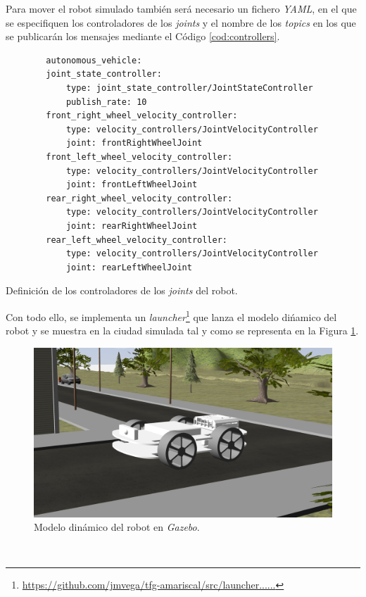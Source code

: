 Para mover el robot simulado también será necesario un fichero \textit{YAML}, en el que se especifiquen los controladores de los \textit{joints} y el nombre de los \textit{topics} en los que se publicarán los mensajes mediante el Código \ref{cod:controllers}.\\

\begin{code}[h]
	\begin{lstlisting}
		autonomous_vehicle:
		joint_state_controller:
			type: joint_state_controller/JointStateController
			publish_rate: 10
		front_right_wheel_velocity_controller:
			type: velocity_controllers/JointVelocityController
			joint: frontRightWheelJoint
		front_left_wheel_velocity_controller:
			type: velocity_controllers/JointVelocityController
			joint: frontLeftWheelJoint
		rear_right_wheel_velocity_controller:
			type: velocity_controllers/JointVelocityController
			joint: rearRightWheelJoint
		rear_left_wheel_velocity_controller:
			type: velocity_controllers/JointVelocityController
			joint: rearLeftWheelJoint
	\end{lstlisting}
	\caption[Definición de los controladores de los \textit{joints} del robot.]{Definición de los controladores de los \textit{joints} del robot.}
	\label{cod:controllers}
\end{code}

Con todo ello, se implementa un \textit{launcher}\footnote{\url{https://github.com/jmvega/tfg-amariscal/src/launcher......}} que lanza el modelo dińamico del robot y se muestra en la ciudad simulada tal y como se representa en la Figura \ref{fig:modelGazebo}.\\

\begin{figure} [h!]
	\begin{center}
		\includegraphics[width=12cm]{figs/modelGazebo}
	\end{center}
	\caption{Modelo dinámico del robot en \textit{Gazebo}.}
	\label{fig:modelGazebo}
\end{figure}\

